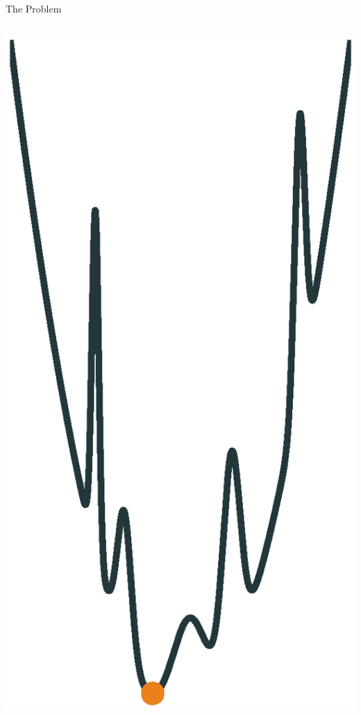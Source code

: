 \documentclass[10pt]{beamer}
\begin{document}
\begin{frame}[fragile]{The Problem}
\begin{columns}{}
\begin{column}{0.45\textwidth}
\begin{overprint}
			    \includegraphics[width=0.9\linewidth]{images/globalmin.eps}

\end{overprint}
\end{column}
\end{columns}
\end{frame}
\end{document}
